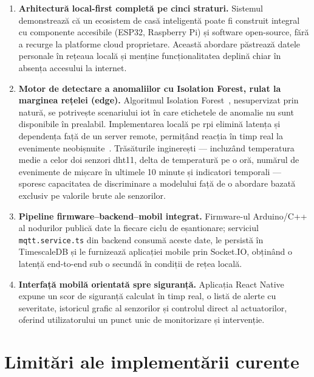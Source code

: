 \begin{enumerate}

\item \textbf{Arhitectură local-first completă pe cinci straturi.}  Sistemul
demonstrează că un ecosistem de casă inteligentă poate fi construit integral
cu componente accesibile (ESP32, Raspberry Pi) și software open-source, fără
a recurge la platforme cloud proprietare.  Această abordare păstrează datele
personale în rețeaua locală și menține funcționalitatea deplină chiar în
absența accesului la internet.

\item \textbf{Motor de detectare a anomaliilor cu Isolation Forest, rulat la
marginea rețelei (\gls{edge}).}  Algoritmul Isolation Forest~\cite{liu2008isolation},
nesupervizat prin natură, se potrivește scenariului \gls{iot} în care
etichetele de anomalie nu sunt disponibile în prealabil.  Implementarea
locală pe \gls{rpi} elimină latența și dependența față de un server remote,
permi\-țând reacția în timp real la evenimente neobișnuite~\cite{shi2016edge,
cook2020anomalyiot}.  Trăsăturile inginerești — incluzând temperatura medie a
celor doi senzori \gls{dht}11, delta de temperatură pe o oră, numărul de
evenimente de mișcare în ultimele 10 minute și indicatori temporali — sporesc
capacitatea de discriminare a modelului față de o abordare bazată exclusiv pe
valorile brute ale senzorilor.

\item \textbf{Pipeline firmware–backend–mobil integrat.}  Firmware-ul
Arduino/C++ al nodurilor publică date la fiecare ciclu de eșantionare;
serviciul \texttt{mqtt.service.ts} din backend consumă aceste date, le
persistă în TimescaleDB și le furnizează aplicației mobile prin Socket.IO,
obținând o latență end-to-end sub o secundă în condiții de rețea locală.

\item \textbf{Interfață mobilă orientată spre siguranță.}  Aplicația React
Native expune un scor de siguranță calculat în timp real, o listă de alerte
cu severitate, istoricul grafic al senzorilor și controlul direct al
actuatorilor, oferind utilizatorului un punct unic de monitorizare și
intervenție.

\end{enumerate}

\section{Limitări ale implementării curente}

